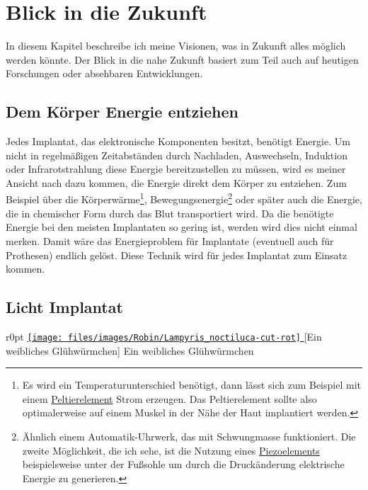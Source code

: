 \section{Blick in die Zukunft}
\label{sec:Robin:future}

In diesem Kapitel beschreibe ich meine Visionen, was in Zukunft alles möglich werden könnte. Der Blick in
die nahe Zukunft basiert zum Teil auch auf heutigen Forschungen oder absehbaren Entwicklungen.

\subsection{Dem Körper Energie entziehen}
Jedes Implantat, das elektronische Komponenten besitzt, benötigt Energie. Um nicht in regelmäßigen
Zeitabständen durch Nachladen, Auswechseln, Induktion oder Infrarotstrahlung diese Energie
bereitzustellen zu müssen, wird es meiner Ansicht nach dazu kommen, die Energie direkt dem Körper zu
entziehen. Zum Beispiel über die Körperwärme\footnote{Es wird ein Temperaturunterschied benötigt,
dann lässt sich zum Beispiel mit einem
\href{http://de.wikipedia.org/wiki/Peltier-Element}{Peltierelement} Strom erzeugen.
Das Peltierelement sollte also optimalerweise auf einem Muskel in der Nähe der Haut implantiert
werden.},
Bewegungsenergie\footnote{Ähnlich einem Automatik-Uhrwerk, das mit Schwungmasse funktioniert.
Die zweite Möglichkeit, die ich sehe, ist die Nutzung eines
\href{http://de.wikipedia.org/wiki/Piezoelement}{Piezoelements} beispielsweise unter der
Fußsohle um durch die Druckänderung elektrische Energie zu generieren.}%
oder später auch die Energie, die in chemischer Form
durch das Blut
transportiert wird. Da die benötigte Energie bei den meisten Implantaten so gering ist, werden wird
dies nicht einmal merken. Damit wäre das Energieproblem für Implantate (eventuell auch für Prothesen)
endlich gelöst.
Diese Technik wird für jedes Implantat zum Einsatz kommen.

\subsection{Licht Implantat}
\begin{wrapfigure}{r}{0pt}
	\href{http://de.wikipedia.org/w/index.php?title=Datei:Lampyris_noctiluca.jpg&filetimestamp=20050618231628}{%
		\texttt{[image: files/images/Robin/Lampyris\_noctiluca-cut-rot]}%
	}
	[Ein weibliches Glühwürmchen]%
		{Ein weibliches Glühwürmchen\footnotemark}%
	\label{fig:Firefly}
\end{wrapfigure}

